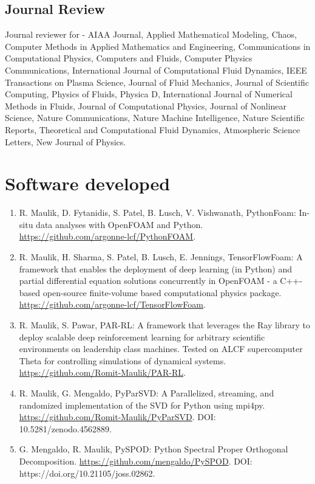 \documentclass[letterpaper]{article}
\renewenvironment{itemize}{
  \begin{list}{}{
    \setlength{\leftmargin}{1.5em}
  }
}{
  \end{list}
}
\begin{document}
\subsection*{Journal Review}

\begin{itemize}
  \item Journal reviewer for - AIAA Journal, Applied Mathematical Modeling, Chaos, Computer Methods in Applied Mathematics and Engineering, Communications in Computational Physics, Computers and Fluids, Computer Physics Communications, International Journal of Computational Fluid Dynamics, IEEE Transactions on Plasma Science, Journal of Fluid Mechanics, Journal of Scientific Computing, Physics of Fluids, Physica D, International Journal of Numerical Methods in Fluids, Journal of Computational Physics, Journal of Nonlinear Science, Nature Communications, Nature Machine Intelligence, Nature Scientific Reports, Theoretical and Computational Fluid Dynamics, Atmospheric Science Letters, New Journal of Physics.
\end{itemize}

\section*{Software developed}

\begin{enumerate}

\item R. Maulik, D. Fytanidis, S. Patel, B. Lusch, V. Vishwanath, PythonFoam: In-situ data analyses with OpenFOAM and Python. \url{https://github.com/argonne-lcf/PythonFOAM}.

\item R. Maulik, H. Sharma, S. Patel, B. Lusch, E. Jennings, TensorFlowFoam: A framework that enables the deployment of deep learning (in Python) and partial differential equation solutions concurrently in OpenFOAM - a C++-based open-source finite-volume based computational physics package. \url{https://github.com/argonne-lcf/TensorFlowFoam}.

\item R. Maulik, S. Pawar, PAR-RL: A framework that leverages the Ray library to deploy scalable deep reinforcement learning for arbitrary scientific environments on leadership class machines. Tested on ALCF supercomputer Theta for controlling simulations of dynamical systems. \url{https://github.com/Romit-Maulik/PAR-RL}.

\item R. Maulik, G. Mengaldo, PyParSVD: A Parallelized, streaming, and randomized implementation of the SVD for Python using mpi4py. \url{https://github.com/Romit-Maulik/PyParSVD}. DOI: 10.5281/zenodo.4562889.

\item G. Mengaldo, R. Maulik, PySPOD: Python Spectral Proper Orthogonal Decomposition. \url{https://github.com/mengaldo/PySPOD}.  DOI: https://doi.org/10.21105/joss.02862.

\end{enumerate}
\end{document}
